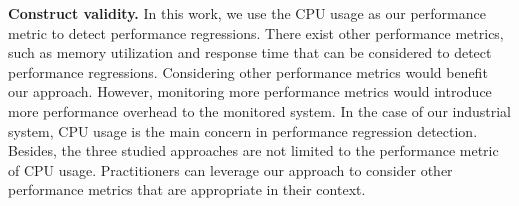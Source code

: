 \noindent \textbf{Construct validity.}
In this work, we use the CPU usage as our performance metric to detect performance regressions.
There exist other performance metrics, such as memory utilization and response time that can be considered to detect performance regressions. 
Considering other performance metrics would benefit our approach.
However, monitoring more performance metrics would introduce more performance overhead to the monitored system.
In the case of our industrial system, CPU usage is the main concern in performance regression detection.
Besides, the three studied approaches are not limited to the performance metric of CPU usage. Practitioners can leverage our approach to consider other performance metrics that are appropriate in their context.